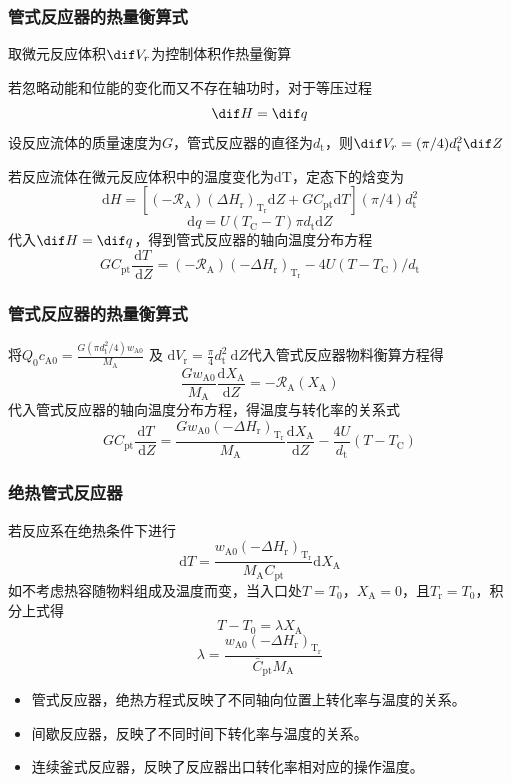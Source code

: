 \documentclass[dvipsnames, svgnames, x11names]{beamer}
\begin{document}
\begin{frame}
    \frametitle{管式反应器的热量衡算式}

    取微元反应体积$\dif V_r$为控制体积作热量衡算

    若忽略动能和位能的变化而又不存在轴功时，对于等压过程
    \[
        \dif H = \dif q
    \]
    设反应流体的质量速度为$G$，管式反应器的直径为$d_\mathrm{t}$，则$\dif V_r = (\pi / 4) d_\mathrm{t}^2 \dif Z$

    若反应流体在微元反应体积中的温度变化为dT，定态下的焓变为
    \[
        \mathrm{d} H=[(-\mathscr{R}_{\mathrm{A}})(\Delta H_{\mathrm{r}})_{\mathrm{T}_{\mathrm{r}}} \mathrm{d} Z+G C_{\mathrm{pt}} \mathrm{d} T](\pi / 4) d_{\mathrm{t}}^{2}
    \]
    \[
        \mathrm{d} q=U(T_{\mathrm{C}}-T) \pi d_{\mathrm{t}} \mathrm{d} Z
    \]
    代入$\dif H = \dif q$，得到管式反应器的轴向温度分布方程
    \[
        G C_{\mathrm{pt}} \frac{\mathrm{d} T}{\mathrm{~d} Z}=(-\mathscr{R}_{\mathrm{A}})(-\Delta H_{\mathrm{r}})_{\mathrm{T}_{\mathrm{r}}}-4 U(T-T_{\mathrm{C}}) / d_{\mathrm{t}}
    \]

\end{frame}


\begin{frame}
    \frametitle{管式反应器的热量衡算式}

    将$Q_{0} c_{\mathrm{A} 0}=\frac{G(\pi d_{\mathrm{t}}^{2} / 4) w_{\mathrm{A} 0}}{M_{\mathrm{A}}} \text { 及 } \mathrm{d} V_{\mathrm{r}}=\frac{\pi}{4} d_{\mathrm{t}}^{2} \mathrm{~d} Z$代入管式反应器物料衡算方程得
    \[
        \frac{G w_{\mathrm{A} 0}}{M_{\mathrm{A}}} \frac{\mathrm{d} X_{\mathrm{A}}}{\mathrm{d} Z}=-\mathscr{R}_{\mathrm{A}}(X_{\mathrm{A}})
    \]
    代入管式反应器的轴向温度分布方程，得温度与转化率的关系式
    \[
        G C_{\mathrm{pt}} \frac{\mathrm{d} T}{\mathrm{~d} Z}=\frac{G w_{\mathrm{A} 0}(-\Delta H_{\mathrm{r}})_{\mathrm{T}_{\mathrm{r}}}}{M_{\mathrm{A}}} \frac{\mathrm{d} X_{\mathrm{A}}}{\mathrm{d} Z}-\frac{4 U}{d_{\mathrm{t}}}(T-T_{\mathrm{C}})
    \]

\end{frame}


\begin{frame}
    \frametitle{绝热管式反应器}

    若反应系在绝热条件下进行
    \[
        \mathrm{d} T=\frac{w_{\mathrm{A} 0}(-\Delta H_{\mathrm{r}})_{\mathrm{T}_{\mathrm{r}}}}{M_{\mathrm{A}}C_{\mathrm{pt}}} \mathrm{d} X_{\mathrm{A}}
    \]
    如不考虑热容随物料组成及温度而变，当入口处$T=T_0$，$X_\mathrm{A}=0$，且$T_\mathrm{r}=T_0$，积分上式得
    \[
        T - T_0 = \lambda X_\mathrm{A}
    \]
    \[
        \lambda = \frac{w_{\mathrm{A} 0}(-\Delta H_{\mathrm{r}})_{\mathrm{T}_{\mathrm{r}}}}{\bar C_{\mathrm{pt}}M_{\mathrm{A}}}
    \]
    \begin{itemize}
        \item 管式反应器，绝热方程式反映了不同轴向位置上转化率与温度的关系。
        \item 间歇反应器，反映了不同时间下转化率与温度的关系。
        \item 连续釜式反应器，反映了反应器出口转化率相对应的操作温度。
    \end{itemize}
    

\end{frame}
\end{document}
